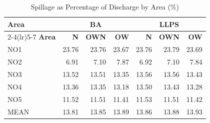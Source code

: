 \begin{table}[htbp]
\centering
\caption{Spillage as Percentage of Discharge by Area (\%)}
\label{tab:spillage_percentage}
\small
\begin{tabular}{lrrrrrr}
\toprule
\textbf{Area} & \multicolumn{3}{c}{\textbf{BA}} & \multicolumn{3}{c}{\textbf{LLPS}} \\
\cmidrule(lr){2-4}\cmidrule(lr){5-7}
\textbf{Area} & \textbf{N} & \textbf{OWN} & \textbf{OW} & \textbf{N} & \textbf{OWN} & \textbf{OW} \\
\midrule
NO1 & 23.76 & 23.76 & 23.67 & 23.76 & 23.79 & 23.69 \\
NO2 & 6.91 & 7.10 & 7.87 & 6.92 & 7.10 & 7.84 \\
NO3 & 13.52 & 13.51 & 13.35 & 13.56 & 13.56 & 13.43 \\
NO4 & 13.36 & 13.35 & 13.18 & 13.50 & 13.43 & 13.28 \\
NO5 & 11.52 & 11.51 & 11.41 & 11.53 & 11.51 & 11.42 \\
MEAN & 13.81 & 13.85 & 13.89 & 13.86 & 13.88 & 13.93 \\
\bottomrule
\end{tabular}
\end{table}
